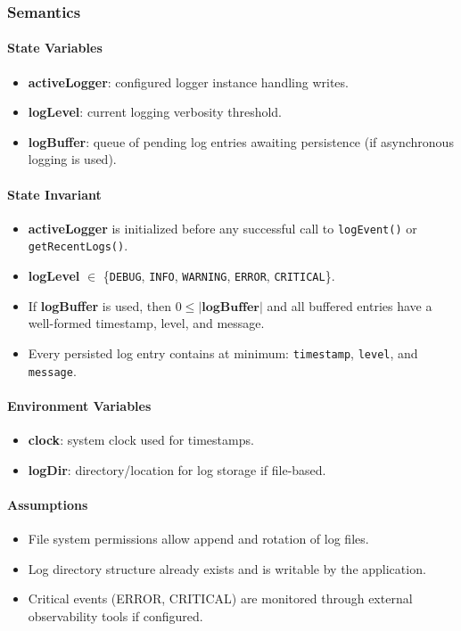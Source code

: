 \documentclass[12pt, titlepage]{article}
\begin{document}
\begin{itemize}
  \subsubsection{Semantics}

  \paragraph{State Variables}
  \begin{itemize}
    \item \textbf{activeLogger}: configured logger instance handling writes.
    \item \textbf{logLevel}: current logging verbosity threshold.
    \item \textbf{logBuffer}: queue of pending log entries awaiting persistence (if asynchronous logging is used).
  \end{itemize}

  \paragraph{State Invariant}
  \begin{itemize}
    \item \textbf{activeLogger} is initialized before any successful call to \texttt{logEvent()} or \texttt{getRecentLogs()}.
    \item \textbf{logLevel} $\in$ \{\texttt{DEBUG}, \texttt{INFO}, \texttt{WARNING}, \texttt{ERROR}, \texttt{CRITICAL}\}.
    \item If \textbf{logBuffer} is used, then $0 \le |\textbf{logBuffer}|$ and all buffered entries have a well-formed timestamp, level, and message.
    \item Every persisted log entry contains at minimum: \texttt{timestamp}, \texttt{level}, and \texttt{message}.
  \end{itemize}


  \paragraph{Environment Variables}
  \begin{itemize}
    \item \textbf{clock}: system clock used for timestamps.
    \item \textbf{logDir}: directory/location for log storage if file-based.
  \end{itemize}

  \paragraph{Assumptions}
  \begin{itemize}
    \item File system permissions allow append and rotation of log files.
    \item Log directory structure already exists and is writable by the application.
    \item Critical events (ERROR, CRITICAL) are monitored through external observability tools if configured.
  \end{itemize}


\end{itemize}
\end{document}
